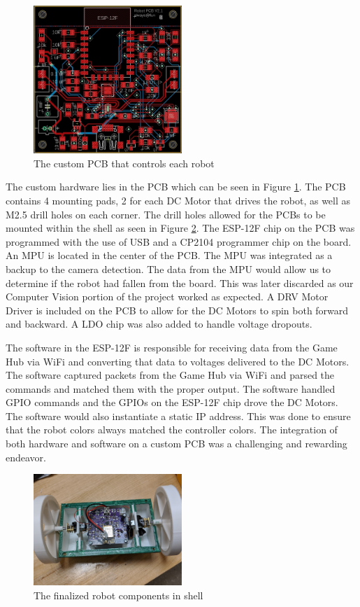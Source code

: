 \documentclass[11pt]{ieeeconf}
\begin{document}
\begin{figure}[H]
\centering
\captionsetup{justification=centering}
\includegraphics[width=0.5\textwidth]{images/FinalPCB.jpg}
\caption{The custom PCB that controls each robot}
\label{PCB}
\end{figure}

The custom hardware lies in the PCB which can be seen in Figure \ref{PCB}. The PCB contains 4 mounting pads, 2 for each DC Motor that drives the robot, as well as M2.5 drill holes on each corner. The drill holes allowed for the PCBs to be mounted within the shell as seen in Figure \ref{robot}. The ESP-12F chip on the PCB was programmed with the use of USB and a CP2104 programmer chip on the board. An MPU is located in the center of the PCB. The MPU was integrated as a backup to the camera detection. The data from the MPU would allow us to determine if the robot had fallen from the board. This was later discarded as our Computer Vision portion of the project worked as expected. A DRV Motor Driver is included on the PCB to allow for the DC Motors to spin both forward and backward. A LDO chip was also added to handle voltage dropouts. 

The software in the ESP-12F is responsible for receiving data from the Game Hub via WiFi and converting that data to voltages delivered to the DC Motors. The software captured packets from the Game Hub via WiFi and parsed the commands and matched them with the proper output. The software handled GPIO commands and the GPIOs on the ESP-12F chip drove the DC Motors. The software would also instantiate a static IP address. This was done to ensure that the robot colors always matched the controller colors. The integration of both hardware and software on a custom PCB was a challenging and rewarding endeavor. 

\begin{figure}[H]
\centering
\captionsetup{justification=centering}
\includegraphics[width=0.5\textwidth]{images/FinalRobot.jpg}
\caption{The finalized robot components in shell}
\label{robot}
\end{figure}
\end{document}

